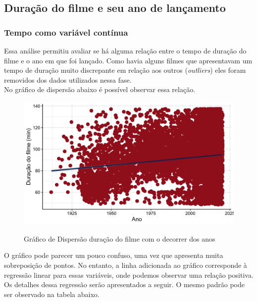 \documentclass[a4paper, 12pt]{article} %
\begin{document}
\subsection{Duração do filme e seu ano de lançamento}

\subsubsection{Tempo como variável contínua}

Essa análise permitiu avaliar se há alguma relação entre o tempo de duração do filme e o ano em que foi lançado. Como havia alguns filmes que apresentavam um tempo de duração muito discrepante em relação aos outros (\emph{outliers}) eles foram removidos dos dados utilizados nessa fase.\\

No gráfico de dispersão abaixo é possível observar essa relação. 

\begin{figure}[H]
    \centering
    \caption{Gráfico de Dispersão duração do filme com o decorrer dos anos}
    \includegraphics[scale=0.15]{Fig_Duracao_Lancamento.png}
    \label{fig:my_label}
\end{figure}

O gráfico pode parecer um pouco confuso, uma vez que apresenta muita sobreposição de pontos. No entanto, a linha adicionada ao gráfico corresponde à regressão linear para essas variáveis, onde podemos observar uma relação positiva. Os detalhes dessa regressão serão apresentados a seguir. O mesmo padrão pode ser observado na tabela abaixo.
\end{document}
